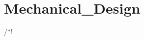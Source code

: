 \chapter{Mechanical\+\_\+\+Design}
\hypertarget{md__mechanical___design}{}\label{md__mechanical___design}
/\texorpdfstring{$\ast$}{*}! 